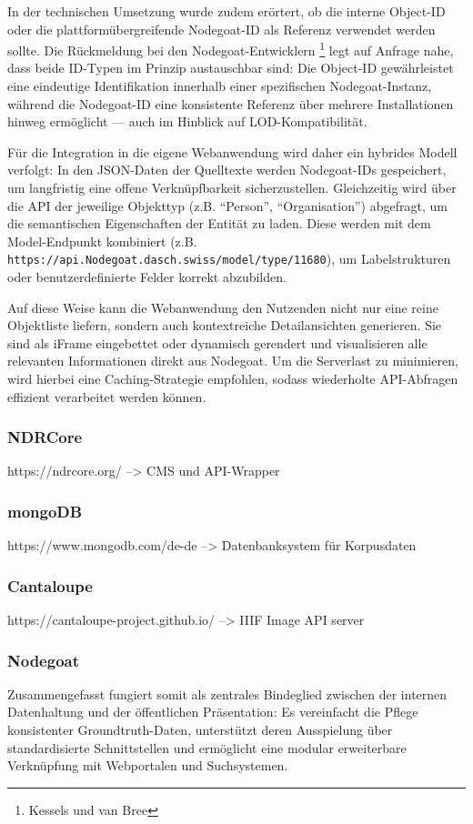 \documentclass[12pt, a4paper, ngerman, bidi=default]{article}
\newcommand{\code}[1]{\colorbox{VeryLightGray}{\texttt{#1}}} %
\begin{document}
In der technischen Umsetzung wurde zudem erörtert, ob die interne Object-ID oder die plattformübergreifende Nodegoat-ID als Referenz verwendet werden sollte. Die Rückmeldung bei den
Nodegoat-Entwicklern \footnote{Kessels und van Bree} legt auf Anfrage nahe, dass beide ID-Typen im Prinzip austauschbar sind: Die Object-ID gewährleistet eine eindeutige Identifikation 
innerhalb einer spezifischen Nodegoat-Instanz, 
während die Nodegoat-ID eine konsistente Referenz über mehrere Installationen hinweg ermöglicht — auch im Hinblick auf LOD-Kompatibilität.

Für die Integration in die eigene Webanwendung wird daher ein hybrides Modell verfolgt: In den JSON-Daten der Quelltexte werden Nodegoat-IDs gespeichert, um langfristig eine offene Verknüpfbarkeit sicherzustellen. 
Gleichzeitig wird über die API der jeweilige Objekttyp (z.B. \enquote{Person}, \enquote{Organisation}) abgefragt, um die semantischen Eigenschaften der Entität zu laden. Diese werden mit dem 
Model-Endpunkt kombiniert (z.B. \code{https://api.Nodegoat.dasch.swiss/model/type/11680}), um  Labelstrukturen oder benutzerdefinierte Felder korrekt abzubilden.

Auf diese Weise kann die Webanwendung den Nutzenden nicht nur eine reine Objektliste liefern, sondern auch kontextreiche Detailansichten generieren. Sie sind als iFrame eingebettet oder dynamisch 
gerendert und visualisieren alle relevanten Informationen direkt aus Nodegoat. Um die Serverlast zu minimieren, wird hierbei eine Caching-Strategie empfohlen, sodass wiederholte API-Abfragen 
effizient verarbeitet werden können.

\subsubsection{NDRCore}

https://ndrcore.org/ --> CMS und API-Wrapper
\subsubsection{mongoDB}
https://www.mongodb.com/de-de  --> Datenbanksystem für Korpusdaten
\subsubsection{Cantaloupe}
https://cantaloupe-project.github.io/  --> IIIF Image API server
\subsubsection{Nodegoat}
Zusammengefasst fungiert  somit als zentrales Bindeglied zwischen der internen Datenhaltung und der öffentlichen Präsentation: Es vereinfacht die Pflege konsistenter Groundtruth-Daten, 
unterstützt deren Ausspielung über standardisierte Schnittstellen und ermöglicht eine modular erweiterbare Verknüpfung mit Webportalen und Suchsystemen.
\end{document}
